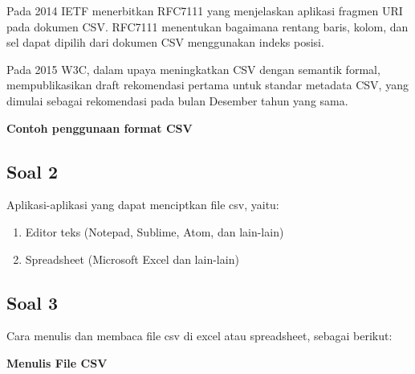 Pada 2014 IETF menerbitkan RFC7111 yang menjelaskan aplikasi fragmen URI pada dokumen CSV. RFC7111 menentukan bagaimana rentang baris, kolom, dan sel dapat dipilih dari dokumen CSV menggunakan indeks posisi.

Pada 2015 W3C, dalam upaya meningkatkan CSV dengan semantik formal, mempublikasikan draft rekomendasi pertama untuk standar metadata CSV, yang dimulai sebagai rekomendasi pada bulan Desember tahun yang sama.

\textbf{Contoh penggunaan format CSV}



\subsection{Soal 2}
Aplikasi-aplikasi yang dapat menciptkan file csv, yaitu:

\begin{enumerate}
	\item Editor teks (Notepad, Sublime, Atom, dan lain-lain)
	\item Spreadsheet (Microsoft Excel dan lain-lain)
\end{enumerate}

\subsection{Soal 3}
Cara menulis dan membaca file csv di excel atau spreadsheet, sebagai berikut:

\textbf{Menulis File CSV}

